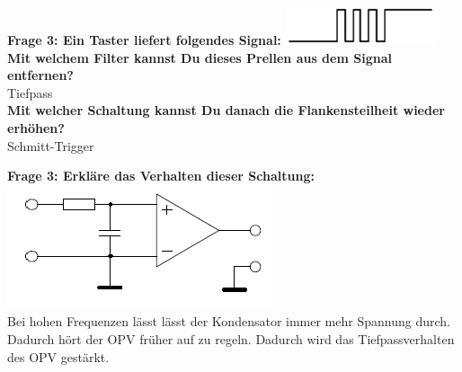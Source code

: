 \documentclass[11pt,a4paper]{scrartcl}
\begin{document}
\textbf{Frage 3: Ein Taster liefert folgendes Signal:} \includegraphics{Taster.png}\\
\textbf{Mit welchem Filter kannst Du dieses Prellen aus dem Signal entfernen?}\\
Tiefpass\\
\textbf{Mit welcher Schaltung kannst Du danach die Flankensteilheit wieder erhöhen?}\\
Schmitt-Trigger

\newpage
\textbf{Frage 3: Erkläre das Verhalten dieser Schaltung:}\\
\includegraphics{Schaltung_1.png}\\
Bei hohen Frequenzen lässt lässt der Kondensator immer mehr Spannung durch. Dadurch hört der OPV früher auf zu regeln. Dadurch wird das Tiefpassverhalten des OPV gestärkt.\\
\end{document}
